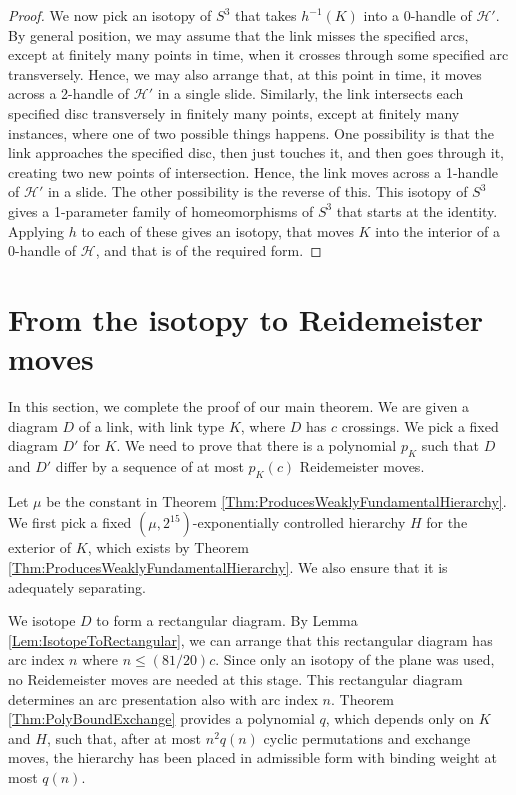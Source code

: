 \documentclass[oneside]{amsart}
\numberwithin{equation}{section}
\theoremstyle{plain}
\theoremstyle{definition}
\begin{document}
\begin{proof}
We now pick an isotopy of $S^3$ that takes $h^{-1}(K)$ into a 0-handle of $\mathcal{H}'$. By general position, we may
assume that the link misses the specified arcs, except at finitely many points in time, when it crosses through some
specified arc transversely. Hence, we may also arrange that, at this point in time, it moves across a 2-handle of
$\mathcal{H}'$ in a single slide. Similarly, the link intersects each specified disc transversely in finitely many points,
except at finitely many instances, where one of two possible things happens. One possibility is that 
the link approaches the specified disc, then just touches it,
and then goes through it, creating two new points of intersection. Hence,
the link moves across a 1-handle of $\mathcal{H}'$ in a slide.
The other possibility is the reverse of this. This isotopy
of $S^3$ gives a 1-parameter family of homeomorphisms of $S^3$ that starts at the identity. Applying
$h$ to each of these gives an isotopy, that moves $K$ into the interior of a 0-handle of $\mathcal{H}$,
and that is of the required form.
\end{proof}

\section{From the isotopy to Reidemeister moves}
\label{Sec:IsotopyToReidemeister}

In this section, we complete the proof of our main theorem. We are given a diagram $D$ of a link, with link type $K$, where
$D$ has $c$ crossings. We pick a fixed diagram $D'$ for $K$. We need to prove that there is a polynomial $p_K$ such that
$D$ and $D'$ differ by a sequence of at most $p_K(c)$ Reidemeister moves.

Let $\mu$ be the constant in Theorem \ref{Thm:ProducesWeaklyFundamentalHierarchy}.
We first pick a fixed $(\mu,2^{15})$-exponentially controlled hierarchy $H$ for the exterior of $K$, which exists by Theorem \ref{Thm:ProducesWeaklyFundamentalHierarchy}. We also ensure that it is adequately separating.

We isotope $D$ to form a rectangular diagram. By Lemma \ref{Lem:IsotopeToRectangular}, we can arrange that this rectangular diagram
has arc index $n$ where $n \leq (81/20)c$. Since only an isotopy of the plane was used, no Reidemeister moves are needed at this
stage. This rectangular diagram determines an arc presentation also with arc index $n$. Theorem \ref{Thm:PolyBoundExchange}
provides a polynomial $q$, which depends only on $K$ and $H$, such that, after at most $n^2 q(n)$ cyclic permutations and exchange moves, 
the hierarchy has been placed in admissible form with binding weight at most $q(n)$.
\end{document}
